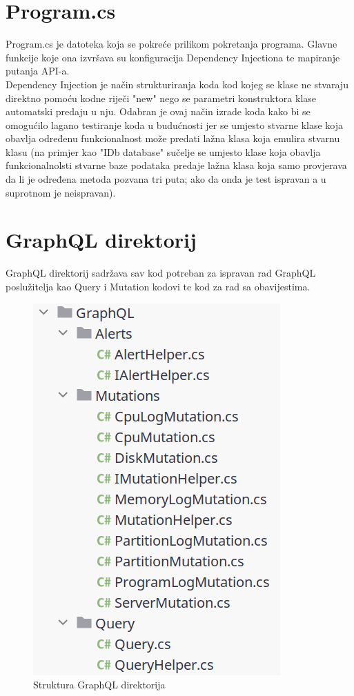 \documentclass[zavrsnirad]{fer}
\begin{document}
\section{Program.cs}
Program.cs je datoteka koja se pokreće prilikom pokretanja programa. Glavne funkcije koje ona izvršava su konfiguracija Dependency Injectiona te mapiranje putanja API-a.
\\Dependency Injection je način strukturiranja koda kod kojeg se klase ne stvaraju direktno pomoću kodne riječi "new" nego se parametri konstruktora klase automatski predaju u nju. Odabran je ovaj način izrade koda kako bi se omogućilo lagano testiranje koda u budućnosti jer se umjesto stvarne klase koja obavlja određenu funkcionalnost može predati lažna klasa koja emulira stvarnu klasu (na primjer kao "IDb database" sučelje se umjesto klase koja obavlja funkcionalnolsti stvarne baze podataka predaje lažna klasa koja samo provjerava da li je određena metoda pozvana tri puta; ako da onda je test ispravan a u suprotnom je neispravan).

\section{GraphQL direktorij}
\label{pog:graphql_dir}
GraphQL direktorij sadržava sav kod potreban za ispravan rad GraphQL poslužitelja kao Query i Mutation kodovi te kod za rad sa obavijestima.

\begin{figure}[htb!]
	\centering
	\includegraphics[width=0.5\linewidth]{images/graphql_dir_structure.png} 
	\caption{Struktura GraphQL direktorija}
\label{slk:graphql_dir_structure}
\end{figure}
\end{document}
